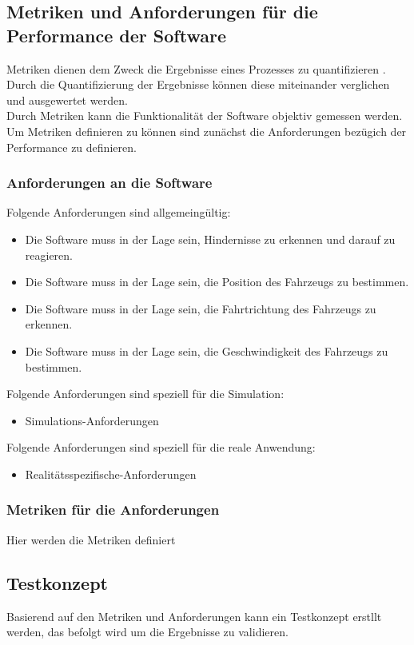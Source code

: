 \subsection{Metriken und Anforderungen für die Performance der Software}
Metriken dienen dem Zweck die Ergebnisse eines Prozesses zu quantifizieren \cite[S. 204]{nirpal2011brief}. Durch die Quantifizierung der Ergebnisse können diese miteinander verglichen und ausgewertet werden. \\
Durch Metriken kann die Funktionalität der Software objektiv gemessen werden. \\
Um Metriken definieren zu können sind zunächst die Anforderungen bezügich der Performance zu definieren. \\
\subsubsection{Anforderungen an die Software}

Folgende Anforderungen sind allgemeingültig:\\
\begin{itemize}
    \item Die Software muss in der Lage sein, Hindernisse zu erkennen und darauf zu reagieren.
    \item Die Software muss in der Lage sein, die Position des Fahrzeugs zu bestimmen.
    \item Die Software muss in der Lage sein, die Fahrtrichtung des Fahrzeugs zu erkennen.
    \item Die Software muss in der Lage sein, die Geschwindigkeit des Fahrzeugs zu bestimmen.
\end{itemize}

Folgende Anforderungen sind speziell für die Simulation:\\
\begin{itemize}
    \item Simulations-Anforderungen
\end{itemize}
Folgende Anforderungen sind speziell für die reale Anwendung:\\
\begin{itemize}
    \item Realitätsspezifische-Anforderungen
\end{itemize}

\subsubsection{Metriken für die Anforderungen}
Hier werden die Metriken definiert

\subsection{Testkonzept}
Basierend auf den Metriken und Anforderungen kann ein Testkonzept erstllt werden, das befolgt wird um die Ergebnisse zu validieren.


